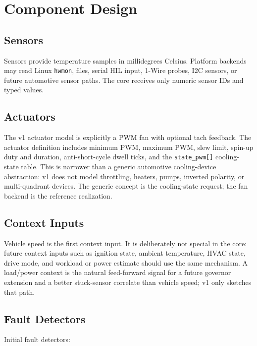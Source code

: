 \section{Component Design}

\subsection{Sensors}

Sensors provide temperature samples in millidegrees Celsius. Platform backends may read Linux \texttt{hwmon}, files, serial HIL input, 1-Wire probes, I2C sensors, or future automotive sensor paths. The core receives only numeric sensor IDs and typed values.

\subsection{Actuators}

The v1 actuator model is explicitly a PWM fan with optional tach feedback. The actuator definition includes minimum PWM, maximum PWM, slew limit, spin-up duty and duration, anti-short-cycle dwell ticks, and the \texttt{state\_pwm[]} cooling-state table. This is narrower than a generic automotive cooling-device abstraction: v1 does not model throttling, heaters, pumps, inverted polarity, or multi-quadrant devices. The generic concept is the cooling-state request; the fan backend is the reference realization.

\subsection{Context Inputs}

Vehicle speed is the first context input. It is deliberately not special in the core: future context inputs such as ignition state, ambient temperature, HVAC state, drive mode, and workload or power estimate should use the same mechanism. A load/power context is the natural feed-forward signal for a future governor extension and a better stuck-sensor correlate than vehicle speed; v1 only sketches that path.

\subsection{Fault Detectors}

Initial fault detectors:

